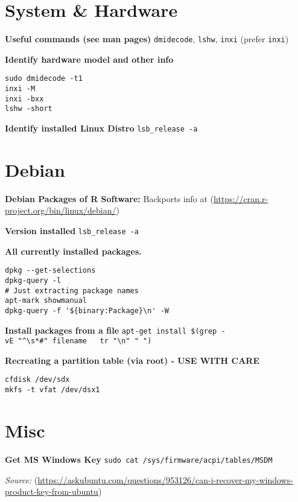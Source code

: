 \documentclass[]{book}
\theoremstyle{definition}
\theoremstyle{definition}
\theoremstyle{definition}
\theoremstyle{remark}
\begin{document}
\section{System \& Hardware}\label{system-hardware}

\textbf{Useful commands (see man pages)} \texttt{dmidecode},
\texttt{lshw}, \texttt{inxi} (prefer \texttt{inxi})

\textbf{Identify hardware model and other info}

\begin{verbatim}
sudo dmidecode -t1
inxi -M
inxi -bxx
lshw -short
\end{verbatim}

\textbf{Identify installed Linux Distro} \texttt{lsb\_release\ -a}

\section{Debian}\label{debian}

\textbf{Debian Packages of R Software:} Backports info at
(\url{https://cran.r-project.org/bin/linux/debian/})

\textbf{Version installed} \texttt{lsb\_release\ -a}

\textbf{All currently installed packages.}

\begin{verbatim}
dpkg --get-selections
dpkg-query -l
# Just extracting package names
apt-mark showmanual
dpkg-query -f '${binary:Package}\n' -W
\end{verbatim}

\textbf{Install packages from a file}
\texttt{apt-get\ install\ \$(grep\ -vE\ "\^{}\textbackslash{}s*\#"\ filename\ \ \textbar{}\ tr\ "\textbackslash{}n"\ "\ ")}

\textbf{Recreating a partition table (via root) - USE WITH CARE}

\begin{verbatim}
cfdisk /dev/sdx
mkfs -t vfat /dev/dsx1
\end{verbatim}

\section{Misc}\label{misc}

\textbf{Get MS Windows Key}
\texttt{sudo\ cat\ /sys/firmware/acpi/tables/MSDM}

\emph{Source:}
(\url{https://askubuntu.com/questions/953126/can-i-recover-my-windows-product-key-from-ubuntu})
\end{document}
